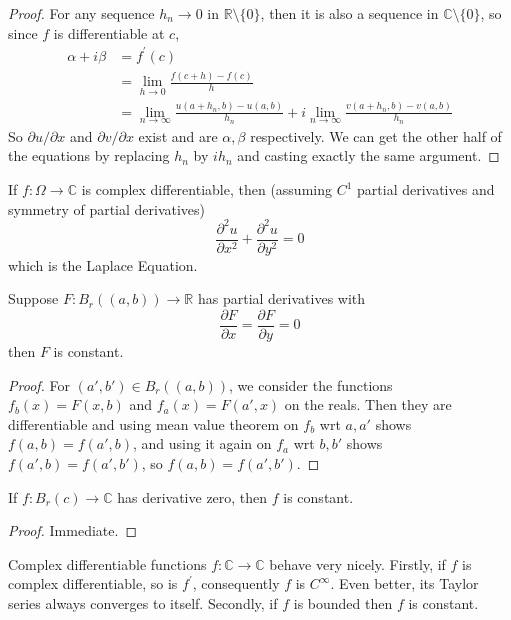 \begin{proof}
    For any sequence $h_n\to 0$ in $\mathbb R\setminus\{0\}$, then it is also a sequence in $\mathbb C\setminus\{0\}$, so since $f$ is differentiable at $c$,
    \begin{align*}
        \alpha+i\beta&=f^\prime(c)\\
        &=\lim_{h\to 0}\frac{f(c+h)-f(c)}{h}\\
        &=\lim_{n\to\infty}\frac{u(a+h_n,b)-u(a,b)}{h_n}+i\lim_{n\to\infty}\frac{v(a+h_n,b)-v(a,b)}{h_n}
    \end{align*}
    So $\partial u/\partial x$ and $\partial v/\partial x$ exist and are $\alpha,\beta$ respectively.
    We can get the other half of the equations by replacing $h_n$ by $ih_n$ and casting exactly the same argument.
\end{proof}
\begin{remark}
    If $f:\Omega\to\mathbb C$ is complex differentiable, then (assuming $C^1$ partial derivatives and symmetry of partial derivatives)
    $$\frac{\partial^2u}{\partial x^2}+\frac{\partial^2u}{\partial y^2}=0$$
    which is the Laplace Equation.
\end{remark}
\begin{proposition}
    Suppose $F:B_r((a,b))\to\mathbb R$ has partial derivatives with
    $$\frac{\partial F}{\partial x}=\frac{\partial F}{\partial y}=0$$
    then $F$ is constant.
\end{proposition}
\begin{proof}
    For $(a',b')\in B_r((a,b))$, we consider the functions $f_b(x)=F(x,b)$ and $f_a(x)=F(a',x)$ on the reals.
    Then they are differentiable and using mean value theorem on $f_b$ wrt $a,a'$ shows $f(a,b)=f(a',b)$, and using it again on $f_a$ wrt $b,b'$ shows $f(a',b)=f(a',b')$, so $f(a,b)=f(a',b')$.
\end{proof}
\begin{corollary}
    If $f:B_r(c)\to\mathbb C$ has derivative zero, then $f$ is constant.
\end{corollary}
\begin{proof}
    Immediate.
\end{proof}
\begin{remark}
    Complex differentiable functions $f:\mathbb C\to\mathbb C$ behave very nicely.
    Firstly, if $f$ is complex differentiable, so is $f^\prime$, consequently $f$ is $C^\infty$.
    Even better, its Taylor series always converges to itself.
    Secondly, if $f$ is bounded then $f$ is constant.
\end{remark}